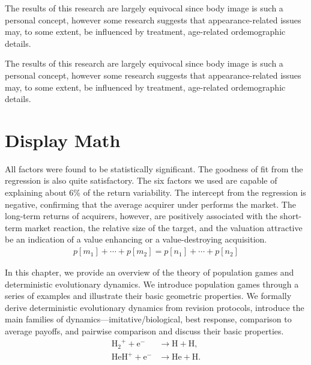\documentclass[onecolumn,authoryear]{els-mrw}
\begin{document}
%

The results of this research are largely equivocal since body image is such a personal
concept, however some research suggests that appearance-related issues may, to some
extent, be influenced by treatment, age-related ordemographic details.

%

The results of this research are largely equivocal since body image is such a personal
concept, however some research suggests that appearance-related issues may, to some
extent, be influenced by treatment, age-related ordemographic details.

\section{Display Math}\label{chap1:sec4}

All factors were found to be statistically significant. The goodness of fit from the
regression is also quite satisfactory. The six factors we used are capable of explaining
about 6\% of the return variability. The intercept from the regression is negative,
confirming that the average acquirer under performs the market. The long-term returns
of acquirers, however, are positively associated with the short-term market reaction,
the relative size of the target, and the valuation attractive be an indication
of a value enhancing
or a value-destroying acquisition.
\begin{align}\label{chap1:eq1}
p[m_1]+\cdots+p[m_2]=p[n_1]+\cdots+p[n_2]
\end{align}

In this chapter, we provide an overview of the theory of population games and deterministic evolutionary dynamics.  We introduce population games through a series of examples and illustrate their basic geometric properties.  We formally derive deterministic evolutionary dynamics from revision protocols, introduce the main families of dynamics---imitative/biological, best response, comparison to average payoffs, and pairwise comparison and discuss their basic properties.
\begin{align}\label{chap1:eq2}
\mathrm{{H_{2}}^{+}} + \mathrm{e}^{-} & \rightarrow  \mathrm{H} + \mathrm{H}, \\
\mathrm{HeH^{+}} + \mathrm{e}^{-} & \rightarrow  \mathrm{He} + \mathrm{H}.\label{chap1:eq3}
\end{align}
\end{document}

